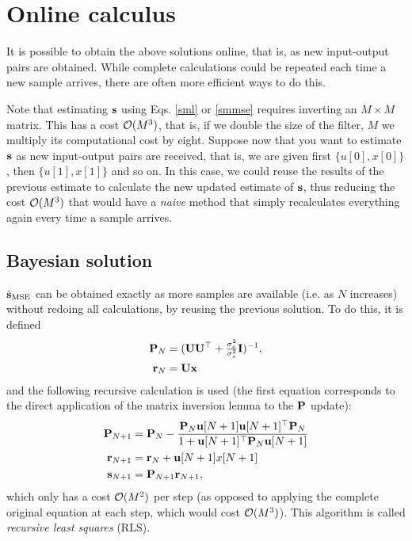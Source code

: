 \section{Online calculus}

It is possible to obtain the above solutions online, that is, as new input-output pairs are obtained. While complete calculations could be repeated each time a new sample arrives, there are often more efficient ways to do this.

Note that estimating ${\mathbf s}$ using Eqs. \eqref{sml} or \eqref{smmse} requires inverting an $M \times M$ matrix. This has a cost ${\mathcal O} (M^3)$, that is, if we double the size of the filter, $M$ we multiply its computational cost by eight. Suppose now that you want to estimate ${\mathbf s}$ as new input-output pairs are received, that is, we are given first $\{u[0], x[0] \}$, then $\{u[1], x[1] \} $ and so on. In this case, we could reuse the results of the previous estimate to calculate the new updated estimate of ${\mathbf s}$, thus reducing the cost ${\mathcal O}(M^3) $ that would have a {\em naive} method that simply recalculates everything again every time a sample arrives.

\subsection{Bayesian solution}

$\hat{{\mathbf s}}_\text{MSE}$ can be obtained exactly as more samples are available (i.e. as $N$ increases) without redoing all calculations, by reusing the previous solution. To do this, it is defined
\begin{align}
{\mathbf P}_N &= ({\mathbf U} {\mathbf U}^\top + \tfrac{\sigma_\varepsilon^2}{\sigma_s^2}{\mathbf I})^{-1}, \\ {\mathbf r}_N &= {\mathbf U} {\mathbf x}
\end{align}
and the following recursive calculation is used (the first equation corresponds to the direct application of the matrix inversion lemma to the ${\mathbf P}$ update):
\begin{align*}
{\mathbf P}_{N+1} 
	&= {\mathbf P}_N -\frac{{\mathbf P}_N{\mathbf u}[N+1]{\mathbf u}[N+1]^\top 
	   {\mathbf P}_N}{1  +{\mathbf u}[N+1]^\top  {\mathbf P}_N{\mathbf u}[N+1]}  \\
{\mathbf r}_{N+1} 
    &= {\mathbf r}_N  +{\mathbf u}[N+1] x[N+1] \\
{\mathbf s}_{N+1}
    &= {\mathbf P}_{N+1}{\mathbf r}_{N+1} ,
\end{align*}
which only has a cost ${\mathcal O}(M^2)$ per step (as opposed to applying the complete original equation at each step, which would cost ${\mathcal O}(M^3) $). This algorithm is called \emph{recursive least squares} (RLS).

